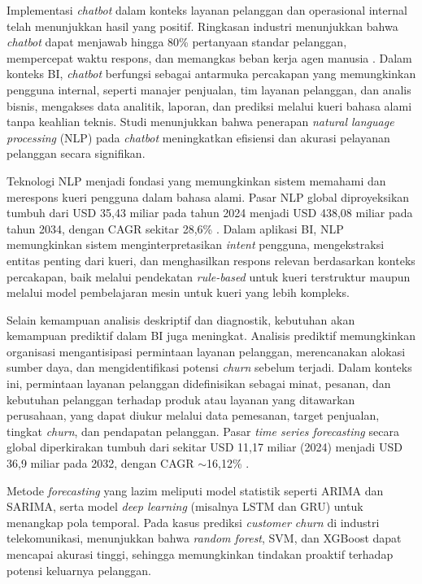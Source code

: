 Implementasi \textit{chatbot} dalam konteks layanan pelanggan dan operasional internal telah menunjukkan hasil yang positif. Ringkasan industri menunjukkan bahwa \textit{chatbot} dapat menjawab hingga 80\% pertanyaan standar pelanggan, mempercepat waktu respons, dan memangkas beban kerja agen manusia \parencite{Fullview2025}. Dalam konteks BI, \textit{chatbot} berfungsi sebagai antarmuka percakapan yang memungkinkan pengguna internal, seperti manajer penjualan, tim layanan pelanggan, dan analis bisnis, mengakses data analitik, laporan, dan prediksi melalui kueri bahasa alami tanpa keahlian teknis. Studi \parencite{Iqbal2021} menunjukkan bahwa penerapan \textit{natural language processing} (NLP) pada \textit{chatbot} meningkatkan efisiensi dan akurasi pelayanan pelanggan secara signifikan.

Teknologi NLP menjadi fondasi yang memungkinkan sistem memahami dan merespons kueri pengguna dalam bahasa alami. Pasar NLP global diproyeksikan tumbuh dari USD 35{,}43 miliar pada tahun 2024 menjadi USD 438{,}08 miliar pada tahun 2034, dengan CAGR sekitar 28{,}6\% \parencite{Precedence2025}. Dalam aplikasi BI, NLP memungkinkan sistem menginterpretasikan \textit{intent} pengguna, mengekstraksi entitas penting dari kueri, dan menghasilkan respons relevan berdasarkan konteks percakapan, baik melalui pendekatan \textit{rule-based} untuk kueri terstruktur maupun melalui model pembelajaran mesin untuk kueri yang lebih kompleks.

Selain kemampuan analisis deskriptif dan diagnostik, kebutuhan akan kemampuan prediktif dalam BI juga meningkat. Analisis prediktif memungkinkan organisasi mengantisipasi permintaan layanan pelanggan, merencanakan alokasi sumber daya, dan mengidentifikasi potensi \textit{churn} sebelum terjadi. Dalam konteks ini, permintaan layanan pelanggan didefinisikan sebagai minat, pesanan, dan kebutuhan pelanggan terhadap produk atau layanan yang ditawarkan perusahaan, yang dapat diukur melalui data pemesanan, target penjualan, tingkat \textit{churn}, dan pendapatan pelanggan. Pasar \textit{time series forecasting} secara global diperkirakan tumbuh dari sekitar USD 11{,}17 miliar (2024) menjadi USD 36{,}9 miliar pada 2032, dengan CAGR \mbox{$\sim$16{,}12\%} \parencite{WiseGuyReports2024}.

Metode \textit{forecasting} yang lazim meliputi model statistik seperti ARIMA dan SARIMA, serta model \textit{deep learning} (misalnya LSTM dan GRU) untuk menangkap pola temporal. Pada kasus prediksi \textit{customer churn} di industri telekomunikasi, \parencite{Lalwani2022} menunjukkan bahwa \textit{random forest}, SVM, dan XGBoost dapat mencapai akurasi tinggi, sehingga memungkinkan tindakan proaktif terhadap potensi keluarnya pelanggan.

